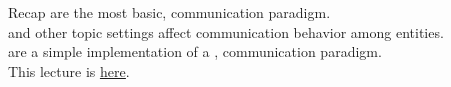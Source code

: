 
\begin{frame}{Recap}
  \justifying
	 are the most basic,  communication paradigm.\\
	\bigskip
	 and other topic settings affect communication behavior among entities.\\
	\bigskip
	 are a simple implementation of a ,  communication paradigm.\\
	\bigskip
	This lecture is \href{https://github.com/robmasocco/DAFN26_Robotics_7}{\color{blue}\underline{here}}.
\end{frame}

